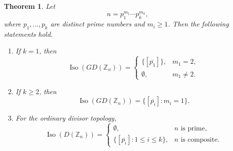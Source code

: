 \documentclass[11pt]{amsart}
\theoremstyle{plain}
\newtheorem{theorem}{Theorem}[section]
\theoremstyle{definition}
\theoremstyle{remark}
\numberwithin{equation}{section}
\begin{document}
\begin{theorem}\label{thm:Zn-isolated}
	Let
	\[
	n=p_1^{m_1}\cdots p_k^{m_k},
	\]
	where $p_1,\ldots,p_k$ are distinct prime numbers and $m_i\geq1$.
	Then the following statements hold.
	\begin{enumerate}
		\item If $k=1$, then
		\[
		\operatorname{Iso}(GD(\mathbb Z_n))
		=
		\begin{cases}
			\{[\overline{p_1}]\}, & m_1=2,\\[2mm]
			\emptyset, & m_1\neq2.
		\end{cases}
		\]
		
		\item If $k\geq2$, then
		\[
		\operatorname{Iso}(GD(\mathbb Z_n))
		=
		\{[\overline{p_i}]:m_i=1\}.
		\]
		
		\item For the ordinary divisor topology,
		\[
		\operatorname{Iso}(D(\mathbb Z_n))
		=
		\begin{cases}
			\emptyset, & n \text{ is prime},\\[2mm]
			\{[\overline{p_i}]:1\leq i\leq k\}, & n \text{ is composite}.
		\end{cases}
		\]
	\end{enumerate}
\end{theorem}
\end{document}
